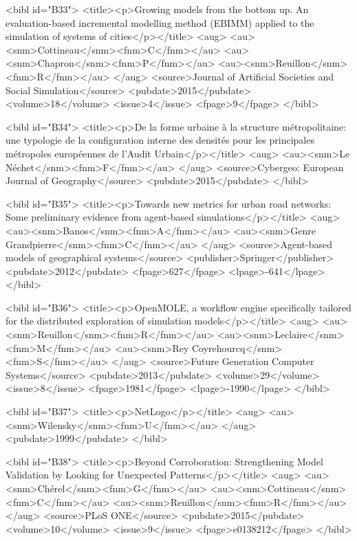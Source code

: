\documentclass{article}
\begin{document}
{<bibl id="B33">
  <title><p>Growing models from the bottom up. An evaluation-based incremental
  modelling method (EBIMM) applied to the simulation of systems of
  cities</p></title>
  <aug>
    <au><snm>Cottineau</snm><fnm>C</fnm></au>
    <au><snm>Chapron</snm><fnm>P</fnm></au>
    <au><snm>Reuillon</snm><fnm>R</fnm></au>
  </aug>
  <source>Journal of Artificial Societies and Social Simulation</source>
  <pubdate>2015</pubdate>
  <volume>18</volume>
  <issue>4</issue>
  <fpage>9</fpage>
</bibl>

<bibl id="B34">
  <title><p>De la forme urbaine {\`a} la structure m{\'e}tropolitaine: une
  typologie de la configuration interne des densit{\'e}s pour les principales
  m{\'e}tropoles europ{\'e}ennes de l'Audit Urbain</p></title>
  <aug>
    <au><snm>Le N{\'e}chet</snm><fnm>F</fnm></au>
  </aug>
  <source>Cybergeo: European Journal of Geography</source>
  <pubdate>2015</pubdate>
</bibl>

<bibl id="B35">
  <title><p>Towards new metrics for urban road networks: Some preliminary
  evidence from agent-based simulations</p></title>
  <aug>
    <au><snm>Banos</snm><fnm>A</fnm></au>
    <au><snm>Genre Grandpierre</snm><fnm>C</fnm></au>
  </aug>
  <source>Agent-based models of geographical systems</source>
  <publisher>Springer</publisher>
  <pubdate>2012</pubdate>
  <fpage>627</fpage>
  <lpage>-641</lpage>
</bibl>

<bibl id="B36">
  <title><p>OpenMOLE, a workflow engine specifically tailored for the
  distributed exploration of simulation models</p></title>
  <aug>
    <au><snm>Reuillon</snm><fnm>R</fnm></au>
    <au><snm>Leclaire</snm><fnm>M</fnm></au>
    <au><snm>Rey Coyrehourcq</snm><fnm>S</fnm></au>
  </aug>
  <source>Future Generation Computer Systems</source>
  <pubdate>2013</pubdate>
  <volume>29</volume>
  <issue>8</issue>
  <fpage>1981</fpage>
  <lpage>-1990</lpage>
</bibl>

<bibl id="B37">
  <title><p>NetLogo</p></title>
  <aug>
    <au><snm>Wilensky</snm><fnm>U</fnm></au>
  </aug>
  <pubdate>1999</pubdate>
</bibl>

<bibl id="B38">
  <title><p>Beyond Corroboration: Strengthening Model Validation by Looking for
  Unexpected Patterns</p></title>
  <aug>
    <au><snm>Ch{\'e}rel</snm><fnm>G</fnm></au>
    <au><snm>Cottineau</snm><fnm>C</fnm></au>
    <au><snm>Reuillon</snm><fnm>R</fnm></au>
  </aug>
  <source>PLoS ONE</source>
  <pubdate>2015</pubdate>
  <volume>10</volume>
  <issue>9</issue>
  <fpage>e0138212</fpage>
</bibl>

}
\end{document}
